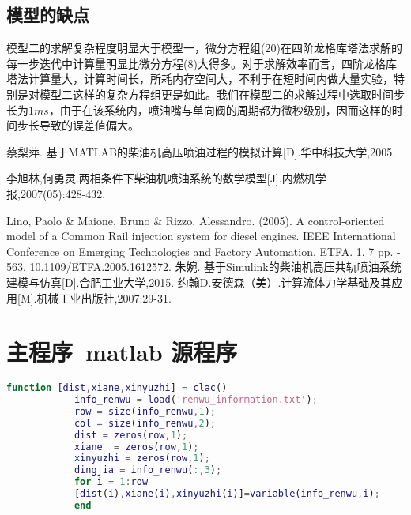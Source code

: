 \documentclass[withoutpreface,bwprint]{cumcmthesis} %
\begin{document}
			\subsection{模型的缺点}
			模型二的求解复杂程度明显大于模型一，微分方程组(20)在四阶龙格库塔法求解的每一步迭代中计算量明显比微分方程(8)大得多。对于求解效率而言，四阶龙格库塔法计算量大，计算时间长，所耗内存空间大，不利于在短时间内做大量实验，特别是对模型二这样的复杂方程组更是如此。我们在模型二的求解过程中选取时间步长为$1ms$，由于在该系统内，喷油嘴与单向阀的周期都为微秒级别，因而这样的时间步长导致的误差值偏大。
			
			
			\begin{thebibliography}{9}%
				 蔡梨萍. 基于MATLAB的柴油机高压喷油过程的模拟计算[D].华中科技大学,2005.
				
				李旭林,何勇灵.两相条件下柴油机喷油系统的数学模型[J].内燃机学报,2007(05):428-432.
				
				Lino, Paolo \& Maione, Bruno \& Rizzo, Alessandro. (2005). A control-oriented model of a Common Rail injection system for diesel engines. IEEE International Conference on Emerging Technologies and Factory Automation, ETFA. 1. 7 pp. - 563. 10.1109/ETFA.2005.1612572. 
				朱婉. 基于Simulink的柴油机高压共轨喷油系统建模与仿真[D].合肥工业大学,2015.
				约翰D.安德森（美）.计算流体力学基础及其应用[M].机械工业出版社,2007:29-31.
				
			\end{thebibliography}
			
			\newpage
			\appendix
			\section{主程序--matlab 源程序}
			\begin{lstlisting}[language=matlab]
			function [dist,xiane,xinyuzhi] = clac()
			info_renwu = load('renwu_information.txt');
			row = size(info_renwu,1);
			col = size(info_renwu,2);
			dist = zeros(row,1);
			xiane  = zeros(row,1);
			xinyuzhi = zeros(row,1);
			dingjia = info_renwu(:,3);
			for i = 1:row
			[dist(i),xiane(i),xinyuzhi(i)]=variable(info_renwu,i); 
			end
			
			\end{lstlisting}
			
\end{document}
